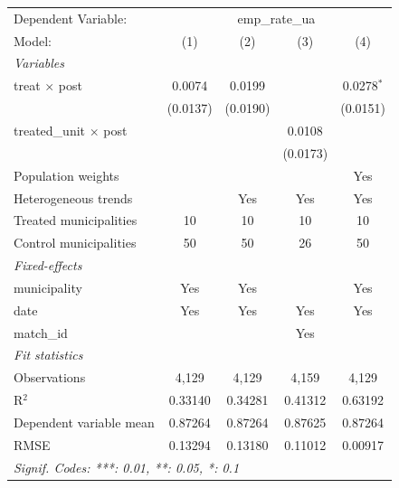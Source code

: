 
\begingroup
\centering
\begin{tabular}{lcccc}
   \tabularnewline \midrule \midrule
   Dependent Variable: & \multicolumn{4}{c}{emp\_rate\_ua}\\
   Model:                        & (1)      & (2)      & (3)      & (4)\\  
   \midrule
   \emph{Variables}\\
   treat $\times$ post           & 0.0074   & 0.0199   &          & 0.0278$^{*}$\\   
                                 & (0.0137) & (0.0190) &          & (0.0151)\\   
   treated\_unit $\times$ post   &          &          & 0.0108   &   \\   
                                 &          &          & (0.0173) &   \\   
   Population weights            &          &          &          & Yes\\  
   Heterogeneous trends          &          & Yes      & Yes      & Yes\\  
   Treated municipalities        & 10       & 10       & 10       & 10\\  
   Control municipalities        & 50       & 50       & 26       & 50\\  
   \midrule
   \emph{Fixed-effects}\\
   municipality                  & Yes      & Yes      &          & Yes\\  
   date                          & Yes      & Yes      & Yes      & Yes\\  
   match\_id                     &          &          & Yes      & \\  
   \midrule
   \emph{Fit statistics}\\
   Observations                  & 4,129    & 4,129    & 4,159    & 4,129\\  
   R$^2$                         & 0.33140  & 0.34281  & 0.41312  & 0.63192\\  
   Dependent variable mean       & 0.87264  & 0.87264  & 0.87625  & 0.87264\\  
   RMSE                          & 0.13294  & 0.13180  & 0.11012  & 0.00917\\  
   \midrule \midrule
   \multicolumn{5}{l}{\emph{Signif. Codes: ***: 0.01, **: 0.05, *: 0.1}}\\
\end{tabular}
\par\endgroup



